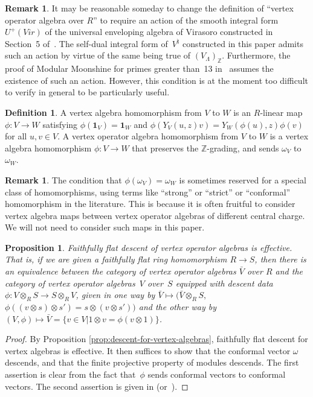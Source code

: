 \documentclass[11pt]{article}
\newcommand{\bZ}{\mathbb{Z}}
\newcommand{\unit}{\mathbf{1}}
\newtheorem{prop}[thm]{Proposition}
\theoremstyle{definition}
\newtheorem{defn}[thm]{Definition}
\newtheorem{rem}[thm]{Remark}
\begin{document}
\begin{rem}It may be reasonable someday to change the definition of ``vertex operator algebra over $R$'' to require an action of the smooth integral form $U^+(Vir)$ of the universal enveloping algebra of Virasoro constructed in Section~5 of~\cite{B99}. The self-dual integral form of~$V^\natural$ constructed in this paper admits such an action by virtue of the same being true of $(V_\Lambda)_{\bZ}$. Furthermore, the proof of Modular Moonshine for primes greater than~13 in~\cite{B98} assumes the existence of such an action. However, this condition is at the moment too difficult to verify in general to be particularly useful.
\end{rem}

\begin{defn}A vertex algebra homomorphism from $V$ to $W$ is an $R$-linear map $\phi\colon V \to W$ satisfying $\phi(\unit_V) = \unit_W$ and $\phi(Y_V(u,z)v) = Y_W(\phi(u),z)\phi(v)$ for all $u,v \in V$. A vertex operator algebra homomorphism from $V$ to $W$ is a vertex algebra homomorphism $\phi\colon V \to W$ that preserves the $\bZ$-grading, and sends $\omega_V$ to $\omega_W$.
\end{defn}

\begin{rem}The condition that $\phi(\omega_V) = \omega_W$ is sometimes reserved for a special class of homomorphisms, using terms like ``strong'' or ``strict'' or ``conformal'' homomorphism in the literature. This is because it is often fruitful to consider vertex algebra maps between vertex operator algebras of different central charge. We will not need to consider such maps in this paper.
\end{rem}

\begin{prop} \label{prop:faithfully-flat-descent-for-voas}Faithfully flat descent of vertex operator algebras is effective. That is, if we are given a faithfully flat ring homomorphism $R \to S$, then there is an equivalence between the category of vertex operator algebras $\bar{V}$ over $R$ and the category of vertex operator algebras~$V$ over~$S$ equipped with descent data $\phi\colon V \otimes_{R} S \to S \otimes_{R} V$, given in one way by $\bar{V} \mapsto (\bar{V} \otimes_{R} S,$ $\phi((v \otimes s) \otimes s') = s \otimes (v \otimes s'))$ and the other way by $(V, \phi) \mapsto \bar{V} = \{v \in V | 1 \otimes v = \phi(v \otimes 1)\}$.
\end{prop}
\begin{proof}By Proposition \ref{prop:descent-for-vertex-algebras}, faithfully flat descent for vertex algebras is effective. It then suffices to show that the conformal vector $\omega$ descends, and that the finite projective property of modules descends. The first assertion is clear from the fact that~$\phi$ sends conformal vectors to conformal vectors. The second assertion is given in \cite[\href{https://stacks.math.columbia.edu/tag/058S}{Proposition 058S}]{Stacks} (or~\cite[Proposition~2.5.2]{EGA4v2}).
\end{proof}
\end{document}
